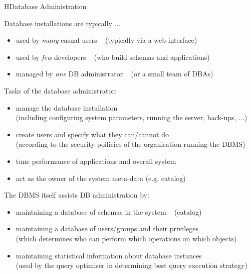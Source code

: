 \begin{lecture}{H}{Database Administration}

\begin{slide}
Database installations are typically ...
\begin{itemize}
\vspace{-1ex}\item used by {\em{many}} casual users ~ {\small (typically via a web interface)}
\vspace{-1ex}\item used by {\em{few}} developers ~ {\small (who build schemas and applications)}
\vspace{-1ex}\item managed by {\em{one}} DB administrator ~ {\small (or a small team of DBAs)}
\end{itemize}
\vspace*{1cm}\begin{center}\end{center}
\end{slide}

\begin{slide}
Tasks of the database administrator:
\begin{itemize}
\item manage the database installation \\
	{\small (including configuring system parameters, running the server, back-ups, ...)}
\item create users and specify what they can/cannot do \\
	{\small (according to the security poilicies of the organisation running the DBMS)}
\item tune performance of applications and overall system
\item act as the owner of the system meta-data {\small (e.g. catalog)}
\end{itemize}
\end{slide}

\begin{slide}
The DBMS itself assists DB administration by:
\begin{itemize}
\item maintaining a database of schemas in the system ~ {\small (catalog)}
\item maintaining a database of users/groups and their privileges \\
	{\small (which determines who can perform which operations on which objects)}
\item maintaining statistical information about database instances \\
	{\small (used by the query optimiser in determining best query execution strategy)}
\end{itemize}
\end{slide}


\end{lecture}
